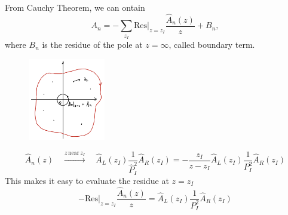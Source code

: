 \documentclass{beamer}
\begin{document}
\begin{frame}
    From Cauchy Theorem, we can ontain
    \begin{equation*}
        A_n=-\sum_{z_I}\textrm{Res}|_{z=z_I}\frac{\hat{A}_n(z)}{z}+B_n,
    \end{equation*}
    where $B_n$ is the residue of the pole at $z=\infty$, called boundary term.
    \vspace{-1em}
    \begin{figure}[htbp]
        \centering
        \includegraphics[width=0.3\textwidth]{CT.png}
    \end{figure}
    \vspace{-1.5em}
    \begin{equation*}
        \hat{A}_n(z)\quad \xrightarrow{z\,\text{near}\,z_I} \quad \hat{A}_L(z_I)\frac{1}{\hat{P}_I^2}\hat{A}_R(z_I)= - \frac{z_I}{z-z_I}\hat{A}_L(z_I)\frac{1}{P_I^2}\hat{A}_R(z_I)
    \end{equation*}
    This makes it easy to evaluate the residue at $z=z_I$
    \begin{equation*}
        -\mathrm{Res}|_{z=z_I}\frac{\hat{A}_n(z)}{z}=\hat{A}_L(z_I)\frac{1}{P_I^2}\hat{A}_R(z_I)
    \end{equation*}
\end{frame}
\end{document}
